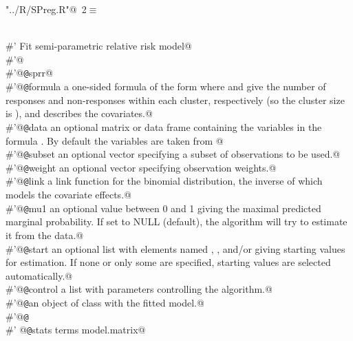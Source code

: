 \documentclass[reqno]{amsart}
\renewcommand{\NWtarget}[2]{\hypertarget{#1}{#2}}
\begin{document}
\begin{flushleft} \small\label{scrap3}\raggedright\small
\NWtarget{nuweb2}{} \verb@"../R/SPreg.R"@\nobreak\ {\footnotesize {2}}$\equiv$
\vspace{-1ex}
\begin{list}{}{} \item
\mbox{}\verb@@\\
\mbox{}\verb@#' Fit semi-parametric relative risk model@\\
\mbox{}\verb@#'@\\
\mbox{}\verb@#'@{\tt @}\verb@rdname sprr@\\
\mbox{}\verb@#'@{\tt @}\verb@param formula a one-sided formula of the form  where  and  give the number of responses and non-responses within each cluster, respectively (so the cluster size is ), and  describes the covariates.@\\
\mbox{}\verb@#'@{\tt @}\verb@param data  an optional matrix or data frame containing the variables in the formula . By default the variables are taken from @\\
\mbox{}\verb@#'@{\tt @}\verb@param subset  an optional vector specifying a subset of observations to be used.@\\
\mbox{}\verb@#'@{\tt @}\verb@param weight  an optional vector specifying observation weights.@\\
\mbox{}\verb@#'@{\tt @}\verb@param link      a link function for the binomial distribution, the inverse of which models the covariate effects.@\\
\mbox{}\verb@#'@{\tt @}\verb@param mu1       an optional value between 0 and 1 giving the maximal predicted marginal probability. If set to NULL (default), the algorithm will try to estimate it from the data.@\\
\mbox{}\verb@#'@{\tt @}\verb@param start     an optional list with elements named , , and/or  giving starting values for estimation. If none or only some are specified, starting values are selected automatically.@\\
\mbox{}\verb@#'@{\tt @}\verb@param control a list with parameters controlling the algorithm.@\\
\mbox{}\verb@#'@{\tt @}\verb@return an object of class  with the fitted model.@\\
\mbox{}\verb@#'@{\tt @}\verb@export@\\
\mbox{}\verb@#' @{\tt @}\verb@importFrom stats terms model.matrix@\\

\end{list}
\end{flushleft}
\end{document}
